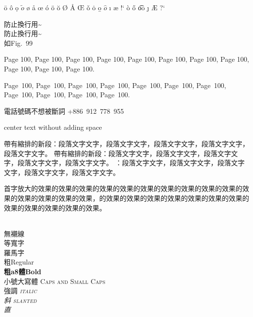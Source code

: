 \documentclass[12pt]{article}
\newenvironment{tightcenter}{%
	\setlength\topsep{0pt}
	\setlength\parskip{0pt}
	\begin{center}
	}{%
	\end{center}
}
\newenvironment{tightright}{%
	\setlength\topsep{0pt}
	\setlength\parskip{0pt}
	\begin{flushright}
	}{%
	\end{flushright}
}
\begin{document}
\begin{CJK*}{UTF8}{bkai}
	\begin{tightright}
	\=o
	\^o
	\d{o}
	$\tilde{o}$
	\o
	\aa
	\oe
	\'o
	\"o
	\u{o}
	\O
	\AA
	\OE
	\v o
	\.o
	\b{o}
	$\hat{o}$
	\i
	\ae
	!`
	\`o
	\H{o}
	\t{oo}
	\j
	\AE
	?`
	\end{tightright}
	
	\mbox{}		
	
	\begin{tightcenter}
	防止換行用\textasciitilde\\	
	防止換行用\textasciitilde\\
	如Fig.~99 %
	\end{tightcenter}	
	
	Page 100,  Page 100,  Page 100,  Page 100,  Page 100,  Page 100,  Page 100,  Page 100,  Page 100,  Page 100,  Page 100.
	
	Page~100,  Page~100,  Page~100,  Page~100,  Page~100,  Page~100,  Page~100,  Page~100,  Page~100,  Page~100,  Page~100.
	
	電話號碼不想被斷詞 \mbox{+886 912 778 955} %
	
	\mbox{}
	
	\centerline{center text without adding space}
	
	\mbox{}
	
	帶有縮排的新段：段落文字文字，段落文字文字，段落文字文字，段落文字文字，段落文字文字。
	帶有縮排的新段：段落文字文字，段落文字文字，段落文字文字，段落文字文字，段落文字文字。
	：段落文字文字，段落文字文字，段落文字文字，段落文字文字，段落文字文字。
	
	\mbox{}
	
	\lettrine{首字}{放大}的效果的效果的效果的效果的效果的效果的效果的效果的效果的效果的效果的效果的效果的效果的效果，的效果的效果的效果的效果的效果的效果的效果的效果的效果的效果的效果的效果。
	
	\mbox{}\\
	無襯線 \\
	等寬字 \\
	羅馬字 \\	
	{粗Regular}\\
	{\bfseries{粗a8}體Bold}\\
	小號大寫體 \scshape{Caps and Small Caps}\\
	強調 \itshape{italic}\\
	斜 \slshape{slanted}\\
	直 \\
	
	

\end{CJK*}
\end{document}
